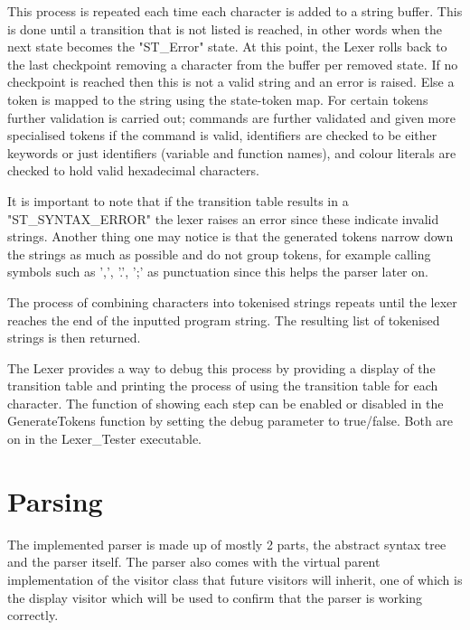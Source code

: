 \documentclass[12pt, a4paper]{report}
\begin{document}
This process is repeated each time each character is added to a string buffer. This is done until a transition that is not listed is reached, in other words when the next state becomes the "ST\_Error" state. At this point, the Lexer rolls back to the last checkpoint removing a character from the buffer per removed state. If no checkpoint is reached then this is not a valid string and an error is raised. Else a token is mapped to the string using the state-token map. For certain tokens further validation is carried out; commands are further validated and given more specialised tokens if the command is valid, identifiers are checked to be either keywords or just identifiers (variable and function names), and colour literals are checked to hold valid hexadecimal characters.

It is important to note that if the transition table results in a "ST\_SYNTAX\_ERROR" the lexer raises an error since these indicate invalid strings. Another thing one may notice is that the generated tokens narrow down the strings as much as possible and do not group tokens, for example calling symbols such as ',', '.', ';' as punctuation since this helps the parser later on.

The process of combining characters into tokenised strings repeats until the lexer reaches the end of the inputted program string. The resulting list of tokenised strings is then returned.

The Lexer provides a way to debug this process by providing a display of the transition table and printing the process of using the transition table for each character. The function of showing each step can be enabled or disabled in the GenerateTokens function by setting the debug parameter to true/false. Both are on in the Lexer\_Tester executable.



\chapter{Parsing}
The implemented parser is made up of mostly 2 parts, the abstract syntax tree and the parser itself. The parser also comes with the virtual parent implementation of the visitor class that future visitors will inherit, one of which is the display visitor which will be used to confirm that the parser is working correctly.
\end{document}
